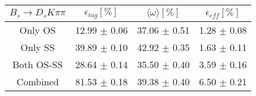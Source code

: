 \begin{tabular}{c c c c}
\hline
\hline
$ B_s \to D_s K \pi \pi$ & $\epsilon_{tag} [\%]$ & $\langle \omega \rangle [\%] $ & $\epsilon_{eff} [\%]$ \\
\hline
Only OS & 12.99 $\pm$ 0.06 & 37.06 $\pm$ 0.51 & 1.28 $\pm$ 0.08\\
Only SS & 39.89 $\pm$ 0.10 & 42.92 $\pm$ 0.35 & 1.63 $\pm$ 0.11\\
Both OS-SS & 28.64 $\pm$ 0.14 & 35.50 $\pm$ 0.40 & 3.59 $\pm$ 0.16\\
\hline
Combined & 81.53 $\pm$ 0.18 & 39.38 $\pm$ 0.40 & 6.50 $\pm$ 0.21\\
\hline
\hline
\end{tabular}
